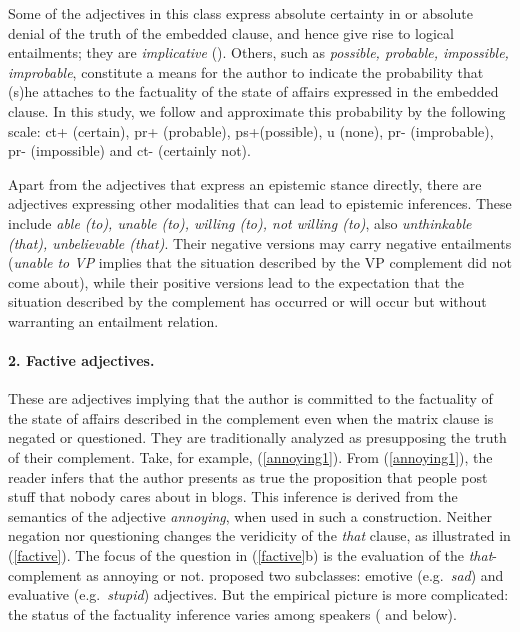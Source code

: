 \documentclass[10pt]{article}
\begin{document}
Some of the adjectives in this class express absolute certainty in or absolute denial of the truth of the embedded clause, and hence give rise to logical entailments; they are \textit{implicative} (\cite{karttunen:1971}). Others, such as \textit{possible, probable, impossible, improbable}, 
constitute a means for the author  to indicate the probability that (s)he attaches to the factuality of the state of affairs expressed in the embedded clause. In this study, we follow \cite{sauri:2008phd} and approximate this probability by the following scale: {\sc ct}+ (certain), {\sc pr}+ (probable), {\sc ps}+(possible), {\sc u} (none), {\sc pr}- (improbable), {\sc pr}- (impossible) and {\sc ct}- (certainly not).

Apart from the adjectives that express an epistemic stance directly, there are adjectives expressing other modalities that can lead to epistemic inferences. These include \textit{able (to), unable (to), willing (to), not willing (to)}, also \textit{unthinkable (that), unbelievable (that)}. Their negative versions may carry negative entailments (\textit{unable to VP} implies that the situation 
described  by the VP complement did not come about), while their positive versions lead to the expectation that the situation described by the complement has occurred or will occur but without warranting an entailment relation.
\vspace{-.2in}
\paragraph{2. Factive adjectives.} These are adjectives  implying that the author is committed to the factuality of the state of affairs described in the complement even when the matrix clause is negated or questioned. They are traditionally analyzed as presupposing the truth of their complement.
Take, for example, (\ref{annoying1}).
 \vspace{-.1in}
 \vspace{-.1in}
From (\ref{annoying1}), the reader infers that the author presents as true the proposition that people post stuff that nobody cares about in blogs.
This inference is derived from the semantics of the adjective {\it annoying}, when used in such a construction. 
Neither negation nor questioning changes the veridicity of the \emph{that }clause, as illustrated in (\ref{factive}).  The focus of the question in (\ref{factive}b) is the evaluation of the \textit{that}-complement as annoying or not.
 \vspace{-.1in}
 \vspace{-.1in}
\cite{norrick:1978} proposed two subclasses: emotive (e.g.\ \textit{sad}) and evaluative (e.g.\ \textit{stupid}) adjectives. But the empirical picture is more complicated: the status of the factuality inference varies among speakers (\cite{csli-gang-cssp13} and below).
\end{document}
